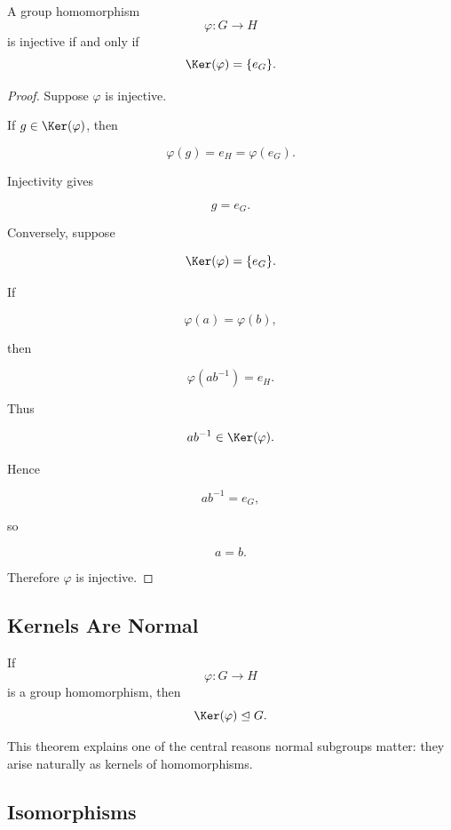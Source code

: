 \begin{theorem}
A group homomorphism
\[ \varphi:G\to H \]
is injective if and only if
\[ \Ker(\varphi)=\{e_G\}. \]
\end{theorem}

\begin{proof}
Suppose \(\varphi\) is injective.

If \(g\in\Ker(\varphi)\), then

\[ \varphi(g)=e_H=\varphi(e_G). \]

Injectivity gives

\[ g=e_G. \]

Conversely, suppose

\[ \Ker(\varphi)=\{e_G\}. \]

If

\[ \varphi(a)=\varphi(b), \]

then

\[ \varphi(ab^{-1})=e_H. \]

Thus

\[ ab^{-1}\in\Ker(\varphi). \]

Hence

\[ ab^{-1}=e_G, \]

so

\[ a=b. \]

Therefore \(\varphi\) is injective.
\end{proof}

\subsection{Kernels Are Normal}
\label{subsec:kernels-normal}

\begin{theorem}
If
\[ \varphi:G\to H \]
is a group homomorphism, then
\[ \Ker(\varphi)\trianglelefteq G. \]
\end{theorem}

This theorem explains one of the central reasons normal subgroups matter:
they arise naturally as kernels of homomorphisms.

\subsection{Isomorphisms}
\label{subsec:group-isomorphisms}

